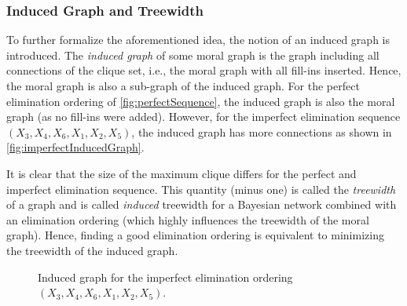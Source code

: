 			\subsubsection{Induced Graph and Treewidth}
				\label{subsec:treewidth}

				To further formalize the aforementioned idea, the notion of an induced graph is introduced. The \emph{induced graph} of some moral graph is the graph including all connections of the clique set, i.e., the moral graph with all fill-ins inserted. Hence, the moral graph is also a sub-graph of the induced graph. For the perfect elimination ordering of \autoref{fig:perfectSequence}, the induced graph is also the moral graph (as no fill-ins were added). However, for the imperfect elimination sequence \( (X_3, X_4, X_6, X_1, X_2, X_5) \), the induced graph has more connections as shown in \autoref{fig:imperfectInducedGraph}.

				It is clear that the size of the maximum clique differs for the perfect and imperfect elimination sequence. This quantity (minus one) is called the \emph{treewidth} of a graph and is called \emph{induced} treewidth for a Bayesian network combined with an elimination ordering (which highly influences the treewidth of the moral graph). Hence, finding a good elimination ordering is equivalent to minimizing the treewidth of the induced graph.

				\begin{figure}
					\centering
					\caption[Induced Graph for Imperfect Elimination Ordering]{Induced graph for the imperfect elimination ordering \( (X_3, X_4, X_6, X_1, X_2, X_5) \).}
					\label{fig:imperfectInducedGraph}
				\end{figure}


